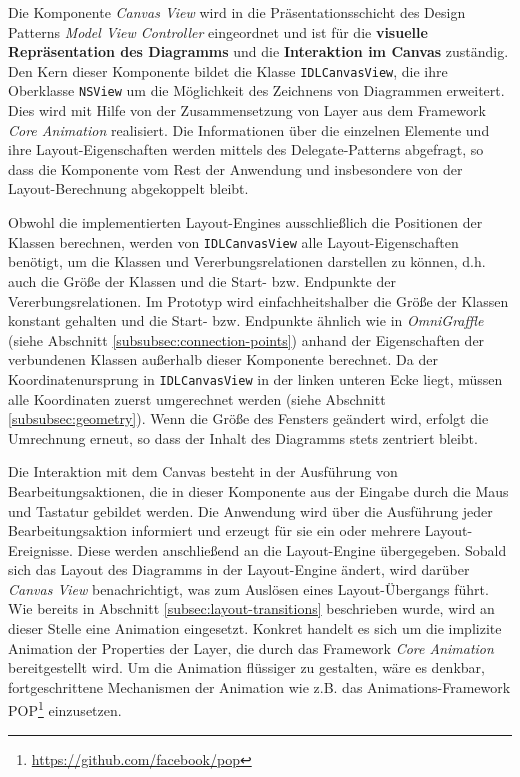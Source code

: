 Die Komponente \textit{Canvas View} wird in die Präsentationsschicht des Design Patterns \textit{Model View Controller} eingeordnet und ist für die \textbf{visuelle Repräsentation des Diagramms} und die \textbf{Interaktion im Canvas} zuständig. Den Kern dieser Komponente bildet die Klasse \texttt{IDLCanvas\-View}, die ihre Oberklasse \texttt{NSView} um die Möglichkeit des Zeichnens von Diagrammen erweitert. Dies wird mit Hilfe von der Zusammensetzung von Layer aus dem Framework \textit{Core Animation} realisiert. Die Informationen über die einzelnen Elemente und ihre Layout-Eigenschaften werden mittels des Delegate-Patterns abgefragt, so dass die Komponente vom Rest der Anwendung und insbesondere von der Layout-Berechnung abgekoppelt bleibt.

Obwohl die implementierten Layout-Engines ausschließlich die Positionen der Klassen berechnen, werden von \texttt{IDLCanvasView} alle Layout-Eigenschaften benötigt, um die Klassen und Vererbungsrelationen darstellen zu können, d.h. auch die Größe der Klassen und die Start- bzw. Endpunkte der Vererbungsrelationen. Im Prototyp wird einfachheitshalber die Größe der Klassen konstant gehalten und die Start- bzw. Endpunkte ähnlich wie in \textit{OmniGraffle} (siehe Abschnitt \ref{subsubsec:connection-points}) anhand der Eigenschaften der verbundenen Klassen außerhalb dieser Komponente berechnet. Da der Koordinatenursprung in \texttt{IDLCanvasView} in der linken unteren Ecke liegt, müssen alle Koordinaten zuerst umgerechnet werden (siehe Abschnitt \ref{subsubsec:geometry}). Wenn die Größe des Fensters geändert wird, erfolgt die Umrechnung erneut, so dass der Inhalt des Diagramms stets zentriert bleibt.

Die Interaktion mit dem Canvas besteht in der Ausführung von Bearbeitungsaktionen, die in dieser Komponente aus der Eingabe durch die Maus und Tastatur gebildet werden. Die Anwendung wird über die Ausführung jeder Bearbeitungsaktion informiert und erzeugt für sie ein oder mehrere Layout-Ereignisse. Diese werden anschließend an die Layout-Engine übergegeben. Sobald sich das Layout des Diagramms in der Layout-Engine ändert, wird darüber \textit{Canvas View} benachrichtigt, was zum Auslösen eines Layout-Übergangs führt. Wie bereits in Abschnitt \ref{subsec:layout-transitions} beschrieben wurde, wird an dieser Stelle eine Animation eingesetzt. Konkret handelt es sich um die implizite Animation der Properties der Layer, die durch das Framework \textit{Core Animation} bereitgestellt wird. Um die Animation flüssiger zu gestalten, wäre es denkbar, fortgeschrittene Mechanismen der Animation wie z.B. das Animations-Framework POP\footnote{\url{https://github.com/facebook/pop}} einzusetzen.

